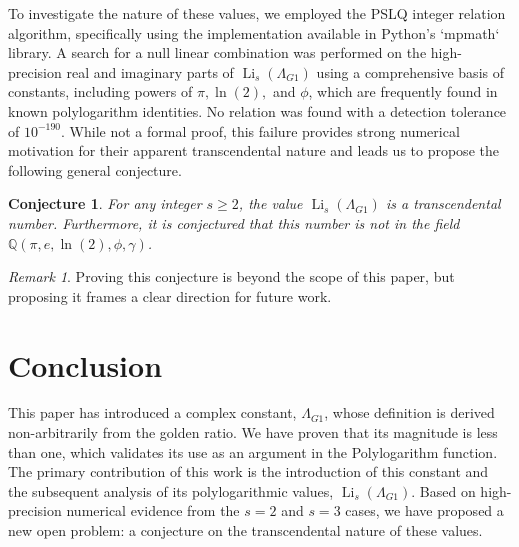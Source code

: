 \documentclass{amsart}
\theoremstyle{plain}
\newtheorem{conjecture}[theorem]{Conjecture}
\theoremstyle{definition}
\theoremstyle{remark}
\newtheorem*{remark}{Remark}
\DeclareMathOperator{\Li}{Li} %
\newcommand{\LambdaG}{\Lambda_{G1}}
\newcommand{\phiG}{\phi}
\begin{document}
To investigate the nature of these values, we employed the PSLQ integer relation algorithm, specifically using the implementation available in Python's `mpmath` library. A search for a null linear combination was performed on the high-precision real and imaginary parts of $\Li_s(\LambdaG)$ using a comprehensive basis of constants, including powers of $\pi, \ln(2),$ and $\phiG$, which are frequently found in known polylogarithm identities. No relation was found with a detection tolerance of $10^{-190}$. While not a formal proof, this failure provides strong numerical motivation for their apparent transcendental nature and leads us to propose the following general conjecture.
\begin{conjecture}
For any integer $s \ge 2$, the value $\Li_s(\LambdaG)$ is a transcendental number. Furthermore, it is conjectured that this number is not in the field $\mathbb{Q}(\pi, e, \ln(2), \phiG, \gamma)$.
\end{conjecture}
\begin{remark}
Proving this conjecture is beyond the scope of this paper, but proposing it frames a clear direction for future work.
\end{remark}

\section{Conclusion}
This paper has introduced a complex constant, $\LambdaG$, whose definition is derived non-arbitrarily from the golden ratio. We have proven that its magnitude is less than one, which validates its use as an argument in the Polylogarithm function. The primary contribution of this work is the introduction of this constant and the subsequent analysis of its polylogarithmic values, $\Li_s(\LambdaG)$. Based on high-precision numerical evidence from the $s=2$ and $s=3$ cases, we have proposed a new open problem: a conjecture on the transcendental nature of these values.

\end{document}
